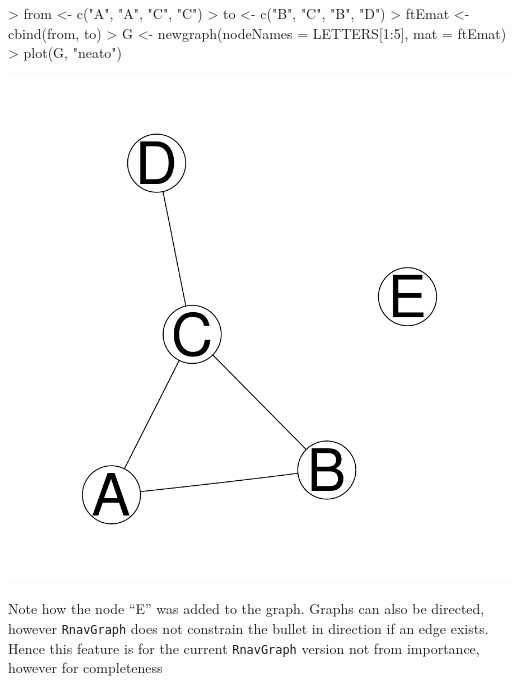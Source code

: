 \documentclass[12pt,oneside,titlepage,letter]{article}
\begin{document}
\begin{center}
\begin{Schunk}
\begin{Sinput}
> from <- c("A", "A", "C", "C")
> to <- c("B", "C", "B", "D")
> ftEmat <- cbind(from, to)
> G <- newgraph(nodeNames = LETTERS[1:5], mat = ftEmat)
> plot(G, "neato")
\end{Sinput}
\end{Schunk}
\includegraphics{sweave_p-035}
\end{center}
Note how the node ``E'' was added to the graph. Graphs can also be directed, however \texttt{RnavGraph} does not constrain the bullet in direction if an edge exists. Hence this feature is for the current \texttt{RnavGraph} version not from importance, however for completeness 
\end{document}

